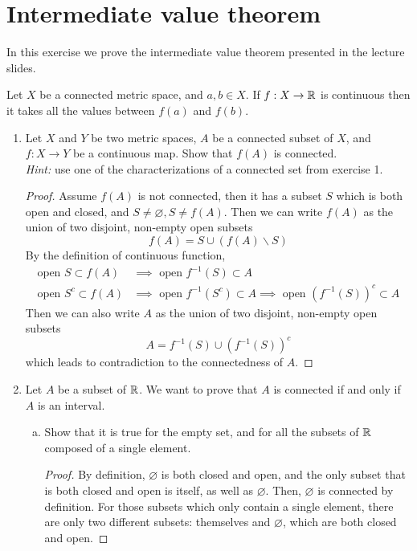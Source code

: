 \section{Intermediate value theorem}
In this exercise we prove the intermediate value theorem presented in the lecture slides.
\begin{theorem}
Let $X$ be a connected metric space, and \(a,b \in X\).
If \(f: X \to\mathbb{R}\) is continuous then it takes all the values between \(f(a)\) and \(f(b)\).
\end{theorem}
\begin{enumerate}
	\item Let $X$ and $Y$ be two metric spaces, $A$ be a connected subset of $X$, and \(f: X\to Y\) be a continuous map.
    Show that \(f(A)\) is connected.\\
    \textit{Hint:} use one of the characterizations of a connected set from exercise 1.
    \begin{proof}
    Assume \(f(A)\) is not connected, then it has a subset $S$ which is both open and closed, and \(S\neq\varnothing,S\neq f(A)\).
    Then we can write \(f(A)\) as the union of two disjoint, non-empty open subsets
    \[ f(A)=S\cup(f(A)\backslash S) \]
    By the definition of continuous function,
    \begin{align*}
    	\text{open } S\subset f(A)&\implies \text{ open }f^{-1}(S)\subset A \\
    	\text{open } S^c\subset f(A)&\implies \text{ open }f^{-1}(S^c)\subset A \implies\text{ open }\left(f^{-1}(S)\right)^c\subset A 
    \end{align*}
    Then we can also write $A$ as the union of two disjoint, non-empty open subsets
    \[ A=f^{-1}(S)\cup \left(f^{-1}(S)\right)^c \]
    which leads to contradiction to the connectedness of $A$.
    \end{proof}
    \item  Let $A$ be a subset of $\mathbb{R}$.
    We want to prove that $A$ is connected if and only if $A$ is an interval.
    \begin{enumerate}[(a)]
    	\item Show that it is true for the empty set, and for all the subsets of $\mathbb{R}$ composed of a single element.
        \begin{proof}
        By definition, $\varnothing$ is both closed and open, and the only subset that is both closed and open is itself, as well as $\varnothing$.
        Then, $\varnothing$ is connected by definition.
        For those subsets which only contain a single element, there are only two different subsets: themselves and $\varnothing$, which are both closed and open.

\end{proof}
\end{enumerate}
\end{enumerate}

